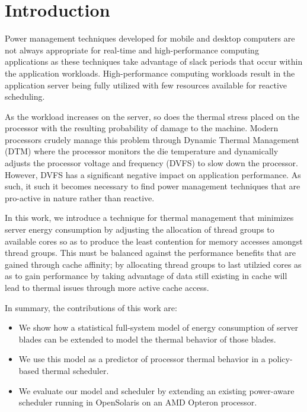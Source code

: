 \documentclass[times,10pt,onecolumn]{article}
\begin{document}
\section{Introduction}
\label{sec:Introduction}
Power management techniques developed for mobile and desktop computers
are not always appropriate for real-time and high-performance computing
applications as these techniques take advantage of slack periods that
occur within the application workloads. High-performance computing
workloads result in the application server being fully utilized with few
resources available for reactive scheduling.

As the workload increases on the server, so does the thermal stress
placed on the processor with the resulting probability of damage to the
machine.  Modern processors crudely manage this problem through Dynamic
Thermal Management (DTM) where the processor monitors the die
temperature and dynamically adjusts the processor voltage and frequency
(DVFS) to slow down the processor.  However, DVFS has a significant
negative impact on application performance.  As such, it such it becomes
necessary to find power management techniques that are pro-active in
nature rather than reactive.

In this work, we introduce a technique for thermal management that
minimizes server energy consumption by adjusting the allocation of
thread groups to available cores so as to produce the least contention
for memory accesses amongst thread groups.  This must be balanced
against the performance benefits that are gained through cache affinity;
by allocating thread groups to last utilzied cores as as to gain
performance by taking advantage of data still existing in cache will
lead to thermal issues through more active cache access.

In summary, the contributions of this work are:
\begin{itemize}
\item We show how a statistical full-system model of energy
  consumption of server blades can be extended to model the thermal
  behavior of those blades.
\item We use this model as a predictor of processor
  thermal behavior in a policy-based thermal scheduler.
\item We evaluate our model and scheduler by extending an existing
  power-aware scheduler running in OpenSolaris on an AMD Opteron
  processor.
\end{itemize}
\end{document}
